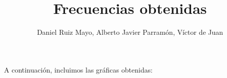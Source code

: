 \documentclass[palatino]{apuntes}
\title{Frecuencias obtenidas}
\author{Daniel Ruiz Mayo, Alberto Javier Parramón, Víctor de Juan}
\date{}
\begin{document}
\pagestyle{plain}
\maketitle
A continuación, incluimos las gráficas obtenidas:



\appendix
\end{document}
